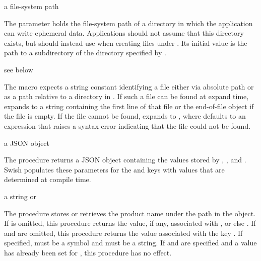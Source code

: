 \begin{parameter}
\end{parameter}
\hasvalue{} a file-system path

The  parameter holds the file-system path of a directory
in which the application can write ephemeral data.
Applications should not assume that this directory exists, but should
instead use  when creating files under .
Its initial value is the path to a  subdirectory of
the directory specified by .

\begin{syntax}
\end{syntax}
\returns{} see below

The  macro expects a string constant 
identifying a file either via absolute path or as a path relative to a
directory in .
If such a file can be found at expand time,  expands to a
string containing the first line of that file or the end-of-file object if the
file is empty.
If the file cannot be found,  expands to
, where  defaults to an
expression that raises a syntax error indicating that the file could not be
found.

\begin{procedure}
\end{procedure}
\hasvalue{} a JSON object

The  procedure returns a JSON object containing the values
stored by
,
, and
.
Swish populates these parameters for the
 and  keys
with values that are determined at compile time.

\begin{parameter}
\end{parameter}
\hasvalue{} a string or 

The  procedure stores or retrieves the product
name under the path  in the
 object.
If  is omitted, this procedure returns the value, if any,
associated with , or else .
If  and  are omitted, this procedure returns the value
associated with the key .
If specified,  must be a symbol and  must be a string.
If  and  are specified and a value has already been
set for , this procedure has no effect.

